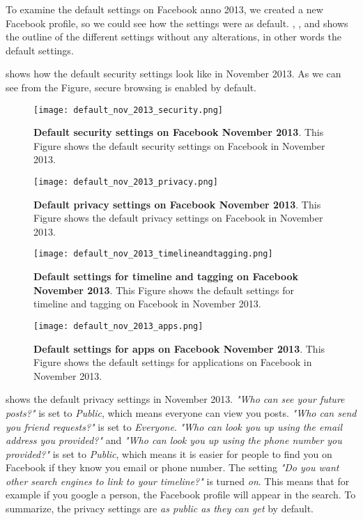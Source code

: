 To examine the default settings on Facebook anno 2013, we created a new Facebook profile, so we could see how the settings were as default. , ,  and  shows the outline of the different settings without any alterations, in other words the default settings. 

 shows how the default security settings look like in November 2013. As we can see from the Figure, secure browsing is enabled by default. 

\begin{figure}[h!]
\centering
\texttt{[image: default\_nov\_2013\_security.png]}
\caption[Default security settings on Facebook November 2013]{\textbf{Default security settings on Facebook November 2013}. This Figure shows the default security settings on Facebook in November 2013.} 
\label{fig:security2013}
\end{figure}

\begin{figure}[h!]
\centering
\texttt{[image: default\_nov\_2013\_privacy.png]}
\caption[Default privacy settings on Facebook November 2013]{\textbf{Default privacy settings on Facebook November 2013}. This Figure shows the default privacy settings on Facebook in November 2013.} 
\label{fig:privacy2013}
\end{figure}

\begin{figure}[h!]
\centering
\texttt{[image: default\_nov\_2013\_timelineandtagging.png]}
\caption[Default settings for timeline and tagging on Facebook November 2013]{\textbf{Default settings for timeline and tagging on Facebook November 2013}. This Figure shows the default settings for timeline and tagging on Facebook in November 2013.} 
\label{fig:timelineandtagging2013}
\end{figure}

\begin{figure}[h!]
\centering
\texttt{[image: default\_nov\_2013\_apps.png]}
\caption[Default settings for apps on Facebook November 2013]{\textbf{Default  settings for apps on Facebook November 2013}. This Figure shows the default settings for applications on Facebook in November 2013.} 
\label{fig:apps2013}
\end{figure}

 shows the default privacy settings in November 2013.  \textit{"Who can see your future posts?"} is set to \textit{Public}, which means everyone can view you posts. \textit{"Who can send you friend requests?"} is set to \textit{Everyone}. \textit{"Who can look you up using the email address you provided?"} and \textit{"Who can look you up using the phone number you provided?"} is set to \textit{Public}, which means it is easier for people to find you on Facebook if they know you email or phone number. The setting \textit{"Do you want other search engines to link to your timeline?"} is turned \textit{on}. This means that for example if you google a person, the Facebook profile will appear in the search. To summarize, the privacy settings are \textit{as public as they can get} by default. 

